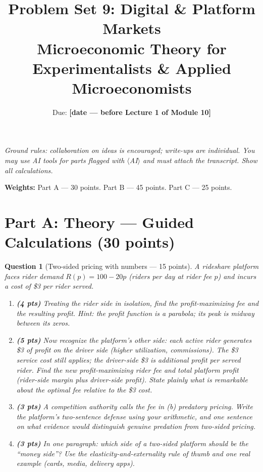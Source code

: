 \documentclass[11pt]{article}
\title{Problem Set 9: Digital \& Platform Markets\\
\large Microeconomic Theory for Experimentalists \& Applied Microeconomists}
\author{Due: \textbf{[date --- before Lecture 1 of Module 10]}}
\date{}
\newtheorem{question}{Question}
\begin{document}
\maketitle

\noindent\emph{Ground rules: collaboration on ideas is encouraged; write-ups
are individual. You may use AI tools for parts flagged with
$\langle$AI$\rangle$ and must attach the transcript. Show all calculations.}

\medskip

\noindent\textbf{Weights:} Part A --- 30 points. Part B --- 45 points.
Part C --- 25 points.

\bigskip

\section*{Part A: Theory --- Guided Calculations (30 points)}

\begin{question}[Two-sided pricing with numbers --- 15 points]
A rideshare platform faces rider demand $R(p) = 100 - 20p$ (riders per
day at rider fee $p$) and incurs a cost of \$3 per rider served.

\begin{enumerate}[label=(\alph*)]
  \item \textbf{(4 pts)} Treating the rider side in isolation, find the
        profit-maximizing fee and the resulting profit. \emph{Hint: the
        profit function is a parabola; its peak is midway between its
        zeros.}
  \item \textbf{(5 pts)} Now recognize the platform's other side: each
        active rider generates \$3 of profit on the driver side (higher
        utilization, commissions). The \$3 service cost still applies;
        the driver-side \$3 is additional profit per served rider. Find
        the new profit-maximizing rider fee and total platform profit
        (rider-side margin plus driver-side profit). State plainly what is remarkable about the
        optimal fee relative to the \$3 cost.
  \item \textbf{(3 pts)} A competition authority calls the fee in (b)
        predatory pricing. Write the platform's two-sentence defense
        using your arithmetic, and one sentence on what evidence would
        distinguish genuine predation from two-sided pricing.
  \item \textbf{(3 pts)} In one paragraph: which side of a two-sided
        platform should be the ``money side''? Use the
        elasticity-and-externality rule of thumb and one real example
        (cards, media, delivery apps).
\end{enumerate}
\end{question}
\end{document}

